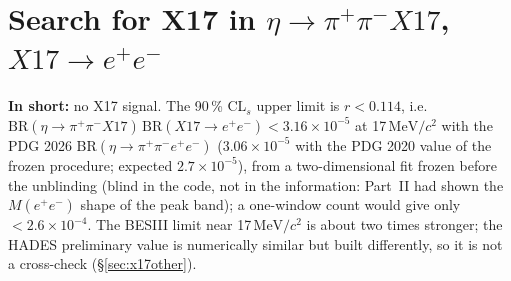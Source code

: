 \documentclass[11pt,a4paper]{article}
\newcommand{\ee}{\ensuremath{e^{+}e^{-}}\xspace}
\newcommand{\pipi}{\ensuremath{\pi^{+}\pi^{-}}\xspace}
\newcommand{\ppee}{\ensuremath{\pi^{+}\pi^{-}e^{+}e^{-}}\xspace}
\newcommand{\Mee}{\ensuremath{M(e^{+}e^{-})}\xspace}
\newcommand{\MeVcc}{\ensuremath{\mathrm{MeV}/c^{2}}\xspace}
\newcommand{\BRX}{\ensuremath{\mathrm{BR}(\eta\to\pipi X17)\,\mathrm{BR}(X17\to\ee)}\xspace}
\newcommand{\tipbox}[1]{\par\noindent\colorbox{blue!6}{\parbox{\dimexpr\linewidth-2\fboxsep\relax}{#1}}\par}
\newcommand{\inshort}[1]{\tipbox{\textbf{In short:} #1}}%
\begin{document}
\section{Search for X17 in \texorpdfstring{$\eta\to\pi^+\pi^-X17$}{eta -> pi+pi-X17}, \texorpdfstring{$X17\to e^+e^-$}{X17 -> e+e-}}
\label{sec:x17}
\inshort{no X17 signal. The 90\,\% CL$_s$ upper limit is $r<0.114$, i.e.\ $\BRX<3.16\times10^{-5}$ at 17\,\MeVcc with the PDG 2026 BR$(\eta\to\ppee)$ ($3.06\times10^{-5}$ with the PDG 2020 value of the frozen procedure; expected $2.7\times10^{-5}$), from a two-dimensional fit frozen before the unblinding (blind in the code, not in the information: Part~II had shown the \Mee shape of the peak band); a one-window count would give only $<2.6\times10^{-4}$. The BESIII limit near 17\,\MeVcc is about two times stronger; the HADES preliminary value is numerically similar but built differently, so it is not a cross-check (\S\ref{sec:x17other}).}
\end{document}

